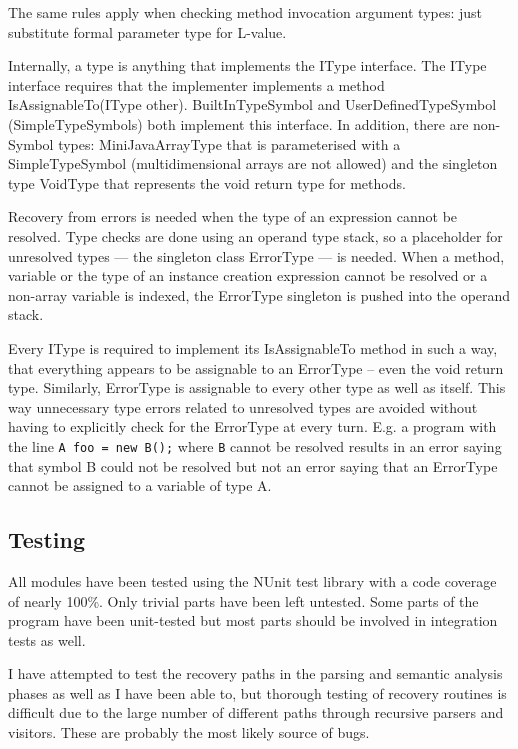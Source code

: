 \documentclass[a4paper,11pt]{article}
\begin{document}
The same rules apply when checking method invocation argument types: just substitute formal parameter type for L-value.

Internally, a type is anything that implements the IType interface. The IType interface requires that the implementer implements a method IsAssignableTo(IType other). BuiltInTypeSymbol and UserDefinedTypeSymbol (SimpleTypeSymbols) both implement this interface. In addition, there are non-Symbol types: MiniJavaArrayType that is parameterised with a SimpleTypeSymbol (multidimensional arrays are not allowed) and the singleton type VoidType that represents the void return type for methods.

Recovery from errors is needed when the type of an expression cannot be resolved. Type checks are done using an operand type stack, so a placeholder for unresolved types --- the singleton class ErrorType --- is needed. When a method, variable or the type of an instance creation expression cannot be resolved or a non-array variable is indexed, the ErrorType singleton is pushed into the operand stack.

Every IType is required to implement its IsAssignableTo method in such a way, that everything appears to be assignable to an ErrorType -- even the void return type. Similarly, ErrorType is assignable to every other type as well as itself. This way unnecessary type errors related to unresolved types are avoided without having to explicitly check for the ErrorType at every turn. E.g. a program with the line \verb,A foo = new B();, where \verb,B, cannot be resolved results in an error saying that symbol B could not be resolved but not an error saying that an ErrorType cannot be assigned to a variable of type A.

\subsection{Testing}

All modules have been tested using the NUnit test library with a code coverage of nearly 100\%. Only trivial parts have been left untested. Some parts of the program have been unit-tested but most parts should be involved in integration tests as well.

I have attempted to test the recovery paths in the parsing and semantic analysis phases as well as I have been able to, but thorough testing of recovery routines is difficult due to the large number of different paths through recursive parsers and visitors. These are probably the most likely source of bugs.
\end{document}

